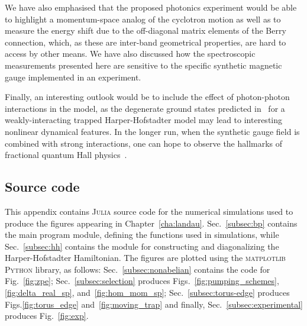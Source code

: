 We have also emphasised that the proposed photonics experiment would
be able to highlight a momentum-space analog of the cyclotron motion
as well as to measure the energy shift due to the off-diagonal matrix
elements of the Berry connection, which, as these are inter-band
geometrical properties, are hard to access by other means. We have
also discussed how the spectroscopic measurements presented here are
sensitive to the specific synthetic magnetic gauge implemented in an
experiment.

Finally, an interesting outlook would be to include the effect of
photon-photon interactions in the model, as the degenerate ground
states predicted in~\cite{ozawa2014momhh} for a weakly-interacting
trapped Harper-Hofstadter model may lead to interesting nonlinear
dynamical features. In the longer run, when the synthetic gauge field
is combined with strong interactions, one can hope to observe the
hallmarks of fractional quantum Hall
physics~\cite{umucalilar2012fractional,hafezi2013non}.

\begin{subappendices}

  \section{Source code}\label{sec:source-code-landau}
  This appendix contains \textsc{Julia} source code for the numerical
  simulations used to produce the figures appearing in
  Chapter~\ref{cha:landau}. Sec.~\ref{subsec:bp} contains the main
  program module, defining the functions used in simulations, while
  Sec.~\ref{subsec:hh} contains the module for constructing and
  diagonalizing the Harper-Hofstadter Hamiltonian.
  The figures are plotted using the \textsc{matplotlib}
  \textsc{Python} library, as follows: Sec.~\ref{subsec:nonabelian}
  contains the code for Fig.~\ref{fig:zpe};
  Sec.~\ref{subsec:selection} produces
  Figs.~\ref{fig:pumping_schemes}, \ref{fig:delta_real_sp},
  and~\ref{fig:hom_mom_sp}; Sec.~\ref{subsec:torus-edge} produces
  Figs.\ref{fig:torus_edge} and~\ref{fig:moving_trap} and finally,
  Sec.~\ref{subsec:experimental} produces Fig.~\ref{fig:exp}.
  
\end{subappendices}

